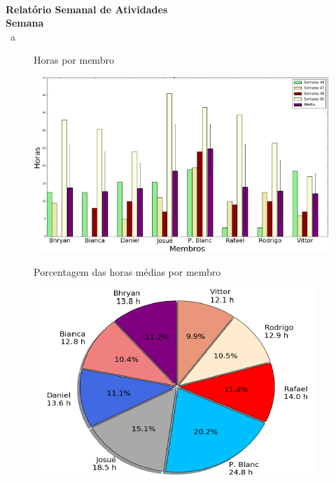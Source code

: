 \documentclass[12pt]{article}
\begin{document}
\begin{titlepage}
\thispagestyle{fancy}

~\vspace{20mm}

\begin{center}
\textbf{\huge Relatório Semanal de Atividades} \\[8mm]
\textbf{\Large Semana \semana} \\
{\Large \dataInicio\ a \dataFim}
\end{center}

\vfill
\begin{figure}[h]
\centering
Horas por membro

\includegraphics[height=.3\textheight]{grafico_barras}
\end{figure}
\vfill
\begin{figure}[h]
\centering
Porcentagem das horas médias por membro

\includegraphics[height=.3\textheight]{grafico_pizza}
\end{figure}
\vfill

\end{titlepage}


\end{document}
